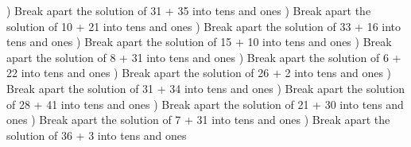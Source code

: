 \documentclass{article}%
\begin{document}
\newline%
) Break apart the solution of 31 + 35 into tens and ones%
\newline%
\newline%
) Break apart the solution of 10 + 21 into tens and ones%
\newline%
\newline%
) Break apart the solution of 33 + 16 into tens and ones%
\newline%
\newline%
) Break apart the solution of 15 + 10 into tens and ones%
\newline%
\newline%
) Break apart the solution of 8 + 31 into tens and ones%
\newline%
\newline%
) Break apart the solution of 6 + 22 into tens and ones%
\newline%
\newline%
) Break apart the solution of 26 + 2 into tens and ones%
\newline%
\newline%
) Break apart the solution of 31 + 34 into tens and ones%
\newline%
\newline%
) Break apart the solution of 28 + 41 into tens and ones%
\newline%
\newline%
) Break apart the solution of 21 + 30 into tens and ones%
\newline%
\newline%
) Break apart the solution of 7 + 31 into tens and ones%
\newline%
\newline%
) Break apart the solution of 36 + 3 into tens and ones%
\newline%
\newline%
\newline%
\end{document}
